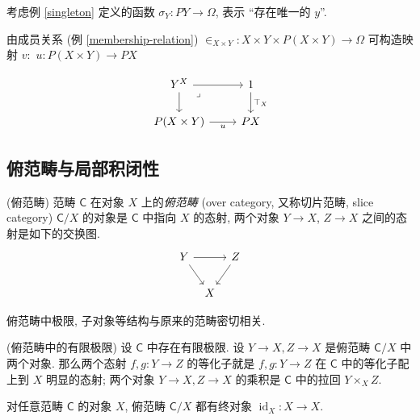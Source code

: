 考虑例 \ref{singleton} 定义的函数 $\sigma_Y\colon PY\to\Omega$, 表示 ``存在唯一的 $y$''.

由成员关系 (例 \ref{membership-relation}) $\in_{X\times Y}\colon X\times Y \times P(X\times Y) \to \Omega$ 可构造映射
$v\colon $
$u\colon P(X\times Y) \to PX$

\[\begin{tikzcd}[ampersand replacement=\&]
	{Y^X} \& 1 \\
	{P(X\times Y)} \& PX
	\arrow[from=1-1, to=1-2]
	\arrow["{\top_X}", from=1-2, to=2-2]
	\arrow[from=1-1, to=2-1]
	\arrow["u"', from=2-1, to=2-2]
	\arrow["\lrcorner"{anchor=center, pos=0.125}, draw=none, from=1-1, to=2-2]
\end{tikzcd}\]


\subsection{俯范畴与局部积闭性}

\label{slice-category}

\begin{definition}
    [label={over-category}]
    {(俯范畴)}
    范畴 $\mathsf C$ 在对象 $X$ 上的\emph{俯范畴} (over category, 又称切片范畴, slice category) $\mathsf C/X$ 的对象是 $\mathsf C$ 中指向 $X$ 的态射, 两个对象 $Y\to X$, $Z \to X$ 之间的态射是如下的交换图.
    \[\begin{tikzcd}[ampersand replacement=\&,column sep=tiny]
    	Y \&\& Z \\
    	\& X
    	\arrow[from=1-1, to=1-3]
    	\arrow[from=1-1, to=2-2]
    	\arrow[from=1-3, to=2-2]
    \end{tikzcd}\]
\end{definition}

俯范畴中极限, 子对象等结构与原来的范畴密切相关.

\begin{prop}
    {(俯范畴中的有限极限)}
    设 $\mathsf C$ 中存在有限极限. 设 $Y\to X,Z\to X$ 是俯范畴 $\mathsf C/X$ 中两个对象.
    那么两个态射 $f,g \colon Y \to Z$ 的等化子就是 $f,g \colon Y \to Z$ 在 $\mathsf C$ 中的等化子配上到 $X$ 明显的态射;
    两个对象 $Y\to X, Z\to X$ 的乘积是 $\mathsf C$ 中的拉回 $Y\times_X Z$.
    
    对任意范畴 $\mathsf C$ 的对象 $X$, 俯范畴 $\mathsf C/X$ 都有终对象 $\operatorname{id}_X\colon X\to X$.
\end{prop}

